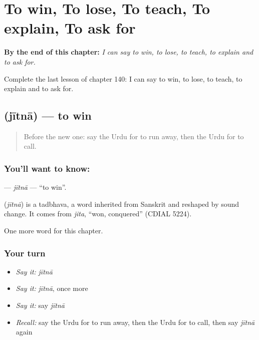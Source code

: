 
\chapter{To win, To lose, To teach, To explain, To ask for}
\label{ch:ur-to-win-to-lose-to-teach-to-explain-to-ask-for}

\begin{chapteropening}
\textbf{By the end of this chapter:} \emph{I can say to win, to lose, to teach, to explain and to ask for.}

Complete the last lesson of chapter 140: I can say to win, to lose, to teach, to explain and to ask for.
\end{chapteropening}

\section[\texorpdfstring{\ur{جیتنا} (jītnā)}{جیتنا (jītnā)}]{ (jītnā) — to win}

\label{lesson:UR-C140-jitna}



\begin{quote}
Before the new one: say the Urdu for to run away, then the Urdu for to call.
\end{quote}

\subsection*{You'll want to know: }
\textbf{} — \emph{jītnā} — \textquotedblleft{}to win\textquotedblright{}.

\begin{cousinweb}
\textbf{} (\emph{jītnā}) is a tadbhava, a word inherited from Sanskrit and reshaped by sound change. It comes from \emph{jita}, \textquotedblleft{}won, conquered\textquotedblright{} (CDIAL 5224).
\end{cousinweb}

\begin{grammarlens}[title={What you've built}]
One more word for this chapter.
\end{grammarlens}

\subsection*{Your turn}
\begin{itemize}
\raggedright
  \item \emph{Say it:} \emph{jītnā}
  \item \emph{Say it:} \emph{jītnā}, once more
  \item \emph{Say it:} say \emph{jītnā}
  \item \emph{Recall:} say the Urdu for to run away, then the Urdu for to call, then say \emph{jītnā} again
\end{itemize}


